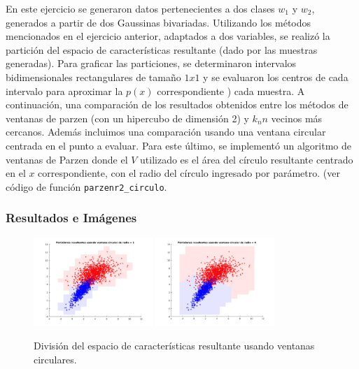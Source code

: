 En este ejercicio se generaron datos pertenecientes a dos clases $w_1$ y $w_2$, generados a partir de dos Gaussinas bivariadas. Utilizando los métodos mencionados en el ejercicio anterior, adaptados a dos variables, se realizó la partición del espacio de características resultante (dado por las muestras generadas). Para graficar las particiones, se determinaron intervalos bidimensionales rectangulares de tamaño $1x1$ y se evaluaron los centros de cada intervalo para aproximar la $p(x)$ correspondiente ) cada muestra.
A continuación, una comparación de los resultados obtenidos entre los métodos de ventanas de parzen (con un hipercubo de dimensión 2) y $k_nn$ vecinos más cercanos. Además incluimos una comparación usando una ventana circular centrada en el punto a evaluar. Para este último, se implementó un algoritmo de ventanas de Parzen donde el $V$ utilizado es el área del círculo resultante centrado en el $x$ correspondiente, con el radio del círculo ingresado por parámetro. (ver código de función \texttt{parzenr2\_circulo}.

\subsubsection{Resultados e Imágenes}

\begin{figure}
\begin{minipage}{\textwidth}
    \begin{center}
        \includegraphics[width=0.4\textwidth]{img/tp3/ej2-1.png}
        \includegraphics[width=0.4\textwidth]{img/tp3/ej2-3.png}
    \end{center}
\label{minipage:ej2-A}
\end{minipage}
\caption{\footnotesize{División del espacio de características resultante usando ventanas circulares.}} 
\end{figure}

